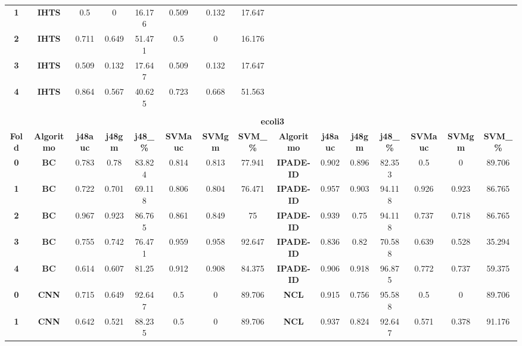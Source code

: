 {{\begin{tabular}{c|c|cccccc|ccccccc}
\textbf{1} & \textbf{IHTS} & 0.5   & 0     & 16.176 & 0.509 & 0.132 & 17.647 &       &       &       &       &       &       &  \\
\textbf{2} & \textbf{IHTS} & 0.711 & 0.649 & 51.471 & 0.5   & 0     & 16.176 &       &       &       &       &       &       &  \\
\textbf{3} & \textbf{IHTS} & 0.509 & 0.132 & 17.647 & 0.509 & 0.132 & 17.647 &       &       &       &       &       &       &  \\
\textbf{4} & \textbf{IHTS} & 0.864 & 0.567 & 40.625 & 0.723 & 0.668 & 51.563 &       &       &       &       &       &       &  \\
\multicolumn{1}{c}{} & \multicolumn{1}{c}{} &       &       &       &       &       & \multicolumn{1}{c}{} &       &       &       &       &       &       &  \\
\multicolumn{1}{c}{} & \multicolumn{14}{c}{\textbf{ecoli3}} \\
\midrule
\textbf{Fold} & \textbf{Algoritmo} & \textbf{j48auc} & \textbf{j48gm} & \textbf{j48\_\%} & \textbf{SVMauc} & \textbf{SVMgm} & \textbf{SVM\_\%} & \multicolumn{1}{c|}{\textbf{Algoritmo}} & \textbf{j48auc} & \textbf{j48gm} & \textbf{j48\_\%} & \textbf{SVMauc} & \textbf{SVMgm} & \textbf{SVM\_\%} \\
\midrule
\textbf{0} & \textbf{BC} & 0.783 & 0.78  & 83.824 & 0.814 & 0.813 & 77.941 & \multicolumn{1}{c|}{\textbf{IPADE-ID}} & 0.902 & 0.896 & 82.353 & 0.5   & 0     & 89.706 \\
\textbf{1} & \textbf{BC} & 0.722 & 0.701 & 69.118 & 0.806 & 0.804 & 76.471 & \multicolumn{1}{c|}{\textbf{IPADE-ID}} & 0.957 & 0.903 & 94.118 & 0.926 & 0.923 & 86.765 \\
\textbf{2} & \textbf{BC} & 0.967 & 0.923 & 86.765 & 0.861 & 0.849 & 75    & \multicolumn{1}{c|}{\textbf{IPADE-ID}} & 0.939 & 0.75  & 94.118 & 0.737 & 0.718 & 86.765 \\
\textbf{3} & \textbf{BC} & 0.755 & 0.742 & 76.471 & 0.959 & 0.958 & 92.647 & \multicolumn{1}{c|}{\textbf{IPADE-ID}} & 0.836 & 0.82  & 70.588 & 0.639 & 0.528 & 35.294 \\
\textbf{4} & \textbf{BC} & 0.614 & 0.607 & 81.25 & 0.912 & 0.908 & 84.375 & \multicolumn{1}{c|}{\textbf{IPADE-ID}} & 0.906 & 0.918 & 96.875 & 0.772 & 0.737 & 59.375 \\
\textbf{0} & \textbf{CNN} & 0.715 & 0.649 & 92.647 & 0.5   & 0     & 89.706 & \multicolumn{1}{c|}{\textbf{NCL}} & 0.915 & 0.756 & 95.588 & 0.5   & 0     & 89.706 \\
\textbf{1} & \textbf{CNN} & 0.642 & 0.521 & 88.235 & 0.5   & 0     & 89.706 & \multicolumn{1}{c|}{\textbf{NCL}} & 0.937 & 0.824 & 92.647 & 0.571 & 0.378 & 91.176 \\

\end{tabular}}}
